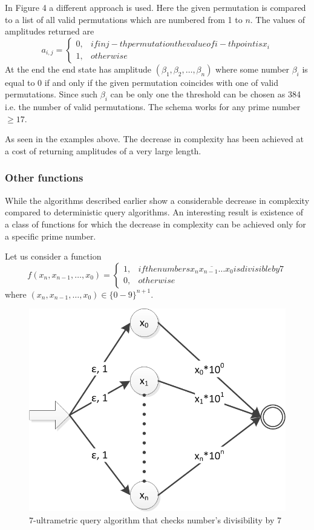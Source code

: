 \documentclass{llncs}
\begin{document}
In Figure 4 a different approach is used. Here the given permutation is compared to a list of all valid permutations which are numbered from 1 to $n$. The values of amplitudes returned are
$$a_{i,j}=\begin{cases}
0, & if in j-th permutation the value of i-th point is x_i \\
1, & otherwise
\end{cases}$$
At the end the end state has amplitude $(\beta_1,\beta_2,\dots,\beta_n)$ where some number $\beta_i$ is equal to 0 if and only if the given permutation coincides with one of valid permutations. Since such $\beta_i$ can be only one the threshold can be chosen as 384 i.e. the number of valid permutations. The schema works for any prime number $\geq 17$.

As seen in the examples above. The decrease in complexity has been achieved at a cost of returning amplitudes of a very large length.

\subsubsection{Other functions}
While the algorithms described earlier show a considerable decrease in complexity compared to deterministic query algorithms. An interesting result is existence of a class of functions for which the decrease in complexity can be achieved only for a specific prime number.

Let us consider a function
$$
f(x_n,x_{n-1},\dots,x_0)=\begin{cases}
1, & if the numbers \overline{x_nx_{n-1}\dots x_0} is divisible by 7 \\
0, & otherwise
\end{cases}
$$
where $(x_n,x_{n-1},\dots,x_0) \in \{0-9\}^{n+1}$.
\begin{figure}
	\centering
	\includegraphics{divisibility.png}
	\caption{$7$-ultrametric query algorithm that checks number's divisibility by 7}
	  \label{div}
\end{figure}
\end{document}
